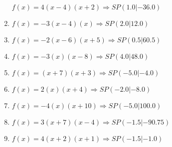 \documentclass{article}%
\begin{document}
\begin{enumerate}[label=\alph*)]
\newline\vspace{0.5cm}$f(x)=4(x-4)(x+2) \Rightarrow SP(1.0|-36.0) $%
\item%
\newline\vspace{0.5cm}$f(x)=-3(x-4)(x) \Rightarrow SP(2.0|12.0) $%
\item%
\newline\vspace{0.5cm}$f(x)=-2(x-6)(x+5) \Rightarrow SP(0.5|60.5) $%
\item%
\newline\vspace{0.5cm}$f(x)=-3(x)(x-8) \Rightarrow SP(4.0|48.0) $%
\item%
\newline\vspace{0.5cm}$f(x)=(x+7)(x+3) \Rightarrow SP(-5.0|-4.0) $%
\item%
\newline\vspace{0.5cm}$f(x)=2(x)(x+4) \Rightarrow SP(-2.0|-8.0) $%
\item%
\newline\vspace{0.5cm}$f(x)=-4(x)(x+10) \Rightarrow SP(-5.0|100.0) $%
\item%
\newline\vspace{0.5cm}$f(x)=3(x+7)(x-4) \Rightarrow SP(-1.5|-90.75) $%
\item%
\newline\vspace{0.5cm}$f(x)=4(x+2)(x+1) \Rightarrow SP(-1.5|-1.0) $%
\end{enumerate}

%
\end{document}
